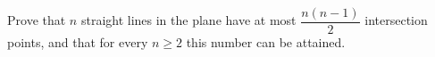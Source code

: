 Prove that $n$ straight lines in the plane have at most $\dfrac{n(n-1)}{2}$ intersection points, and that for every $n\ge2$ this number can be attained.
